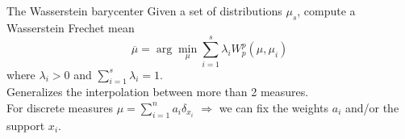 \documentclass[pdf,aspectratio=169,10pt]{beamer}
\begin{document}
\begin{frame}{The Wasserstein barycenter}
    Given a set of distributions $\mu_s$, compute a Wasserstein Frechet mean 
    \begin{equation*}
        \overline{\mu} = \arg \min_{\mu} \sum_{i=1}^s \lambda_i W^p_p(\mu, \mu_i)
    \end{equation*}
    where $\lambda_i > 0$ and $\sum_{i=1}^s \lambda_i  = 1$.\\
    Generalizes the interpolation between more than 2 measures.\\
    For discrete measures $\mu = \sum_{i=1}^n a_i \delta_{x_i}$ $\Rightarrow$ we can fix the weights $a_i$ and/or the support $x_i$.
\end{frame}
\end{document}
